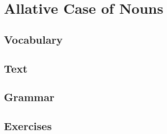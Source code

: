 \chapter{Allative Case of Nouns}
\section*{Vocabulary}
\section*{Text}
\section*{Grammar}
\section*{Exercises}
